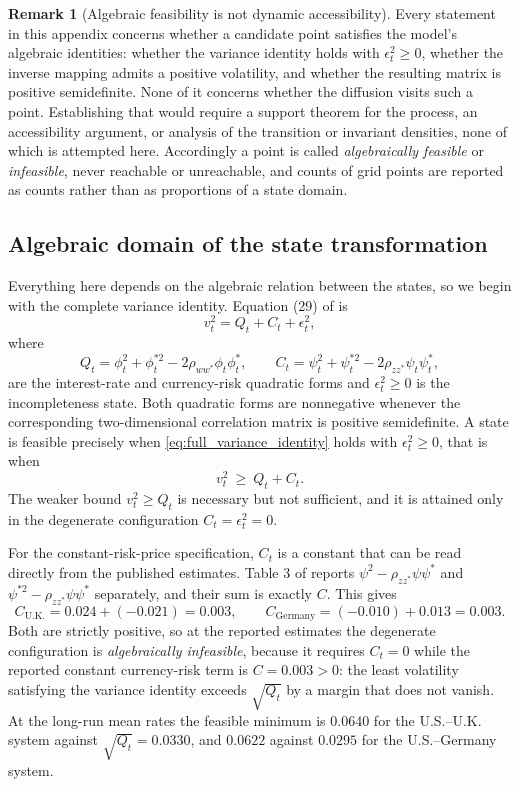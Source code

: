 \documentclass[11pt]{article}
\theoremstyle{definition}
\newtheorem{remark}[remark]{Remark}
\begin{document}
\begin{remark}[Algebraic feasibility is not dynamic accessibility]\label{rem:algebraic_only}
Every statement in this appendix concerns whether a candidate point satisfies the model's algebraic identities: whether the variance identity holds with $\epsilon_t^2\ge0$, whether the inverse mapping admits a positive volatility, and whether the resulting matrix is positive semidefinite. None of it concerns whether the diffusion visits such a point. Establishing that would require a support theorem for the process, an accessibility argument, or analysis of the transition or invariant densities, none of which is attempted here. Accordingly a point is called \emph{algebraically feasible} or \emph{infeasible}, never reachable or unreachable, and counts of grid points are reported as counts rather than as proportions of a state domain.
\end{remark}

\subsection{Algebraic domain of the state transformation}\label{app:psd_feasible}

Everything here depends on the algebraic relation between the states, so we begin with the complete variance identity. Equation (29) of \citet{BrandtSantaClara2002} is
\begin{equation}\label{eq:full_variance_identity}
v_t^2=Q_t+C_t+\epsilon_t^2,
\end{equation}
where
\[
Q_t=\phi_t^2+\phi_t^{*2}-2\rho_{ww^*}\phi_t\phi_t^*,
\qquad
C_t=\psi_t^2+\psi_t^{*2}-2\rho_{zz^*}\psi_t\psi_t^*,
\]
are the interest-rate and currency-risk quadratic forms and $\epsilon_t^2\ge0$ is the incompleteness state. Both quadratic forms are nonnegative whenever the corresponding two-dimensional correlation matrix is positive semidefinite. A state is feasible precisely when \eqref{eq:full_variance_identity} holds with $\epsilon_t^2\ge0$, that is when
\begin{equation}\label{eq:true_floor}
v_t^2\ \ge\ Q_t+C_t .
\end{equation}
The weaker bound $v_t^2\ge Q_t$ is necessary but not sufficient, and it is attained only in the degenerate configuration $C_t=\epsilon_t^2=0$.

For the constant-risk-price specification, $C_t$ is a constant that can be read directly from the published estimates. Table 3 of \citet{BrandtSantaClara2002} reports $\psi^2-\rho_{zz^*}\psi\psi^*$ and $\psi^{*2}-\rho_{zz^*}\psi\psi^*$ separately, and their sum is exactly $C$. This gives
\[
C_{\text{U.K.}}=0.024+(-0.021)=0.003,
\qquad
C_{\text{Germany}}=(-0.010)+0.013=0.003 .
\]
Both are strictly positive, so at the reported estimates the degenerate configuration is \emph{algebraically infeasible}, because it requires $C_t=0$ while the reported constant currency-risk term is $C=0.003>0$: the least volatility satisfying the variance identity exceeds $\sqrt{Q_t}$ by a margin that does not vanish. At the long-run mean rates the feasible minimum is $0.0640$ for the U.S.--U.K. system against $\sqrt{Q_t}=0.0330$, and $0.0622$ against $0.0295$ for the U.S.--Germany system.
\end{document}
